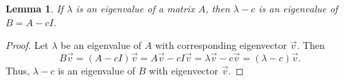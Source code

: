 \documentclass[12pt]{article}
\newtheorem{lemma}{Lemma}
\newcommand{\Z}{\mathbb{Z}}
\begin{document}
	
	\begin{lemma}\label{lem:identeigvals}
		If $\lambda$ is an eigenvalue of a matrix $A$, then $\lambda - c$ is an
		eigenvalue of $B = A - cI$.
	\end{lemma}
	\begin{proof}
		Let $\lambda$ be an eigenvalue of $A$ with corresponding eigenvector
		$\vec{v}$. 
		Then
		\begin{equation*}
		B\vec{v} = (A-cI)\vec{v} = A\vec{v} - cI\vec{v} = \lambda\vec{v} - c\vec{v} =
		\left(\lambda-c\right)\vec{v}.
		\end{equation*}
		Thus, $\lambda - c$ is an eigenvalue of $B$ with eigenvector $\vec{v}$.
	\end{proof}
	
	
\end{document}
